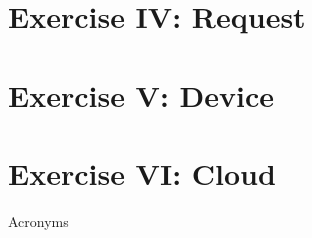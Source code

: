 \documentclass[aspectratio=169]{beamer}
\begin{document}
\section{Exercise IV:  Request}


\section{Exercise V:  Device}


\section{Exercise VI:  Cloud}


% 

\appendix

\begin{frame}[allowframebreaks]{Acronyms}
    \printglossary[type=\acronymtype, nonumberlist]
\end{frame}

%     
\end{document}

